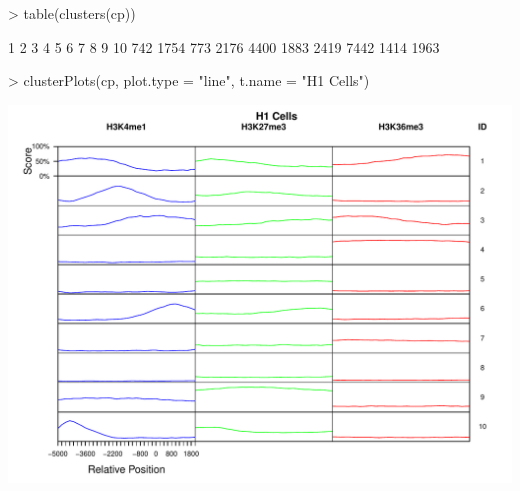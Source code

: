 \begin{Schunk}
\begin{Sinput}
> table(clusters(cp))
\end{Sinput}
\begin{Soutput}
   1    2    3    4    5    6    7    8    9   10 
 742 1754  773 2176 4400 1883 2419 7442 1414 1963 
\end{Soutput}
\begin{Sinput}
> clusterPlots(cp, plot.type = "line", t.name = "H1 Cells")
\end{Sinput}
\end{Schunk}
\includegraphics{clusterPlotsLine-cluPlots3}
